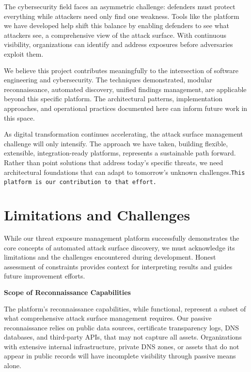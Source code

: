 \documentclass[a4paper,12pt]{report}
\begin{document}
The cybersecurity field faces an asymmetric challenge: defenders must protect everything while attackers need only find one weakness. Tools like the platform we have developed help shift this balance by enabling defenders to see what attackers see, a comprehensive view of the attack surface. With continuous visibility, organizations can identify and address exposures before adversaries exploit them.\hfill \break

We believe this project contributes meaningfully to the intersection of software engineering and cybersecurity. The techniques demonstrated, modular reconnaissance, automated discovery, unified findings management, are applicable beyond this specific platform.\cite{arxiv_2025_paper} The architectural patterns, implementation approaches, and operational practices documented here can inform future work in this space.\hfill \break

As digital transformation continues accelerating, the attack surface management challenge will only intensify. The approach we have taken, building flexible, extensible, integration-ready platforms, represents a sustainable path forward. Rather than point solutions that address today's specific threats, we need architectural foundations that can adapt to tomorrow's unknown challenges.\texttt{This platform is our contribution to that effort.}

\hfill \break


\thispagestyle{plain}
\section*{Limitations and Challenges}
\label{chapter:Limitations}

While our threat exposure management platform successfully demonstrates the core concepts of automated attack surface discovery, we must acknowledge its limitations and the challenges encountered during development. Honest assessment of constraints provides context for interpreting results and guides future improvement efforts.\hfill \break

\textbf{Scope of Reconnaissance Capabilities}\hfill \break

The platform's reconnaissance capabilities, while functional, represent a subset of what comprehensive attack surface management requires. Our passive reconnaissance relies on public data sources, certificate transparency logs, DNS databases, and third-party APIs, that may not capture all assets. Organizations with extensive internal infrastructure, private DNS zones, or assets that do not appear in public records will have incomplete visibility through passive means alone.\hfill \break
\end{document}
